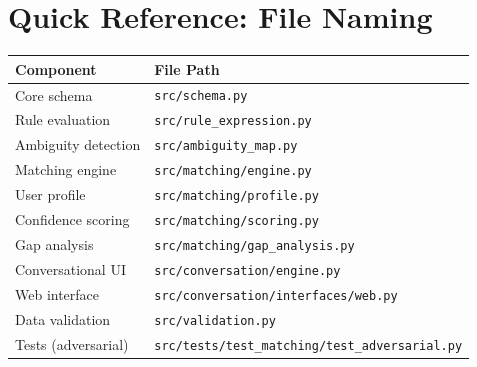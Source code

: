 \documentclass[11pt,a4paper]{report}
\begin{document}
\chapter{Quick Reference: File Naming}

\begin{table}[H]
\centering
\small
\begin{tabular}{p{3cm}p{4cm}}
\toprule
Component & File Path \\
\midrule
Core schema & \texttt{src/schema.py} \\
Rule evaluation & \texttt{src/rule\_expression.py} \\
Ambiguity detection & \texttt{src/ambiguity\_map.py} \\
Matching engine & \texttt{src/matching/engine.py} \\
User profile & \texttt{src/matching/profile.py} \\
Confidence scoring & \texttt{src/matching/scoring.py} \\
Gap analysis & \texttt{src/matching/gap\_analysis.py} \\
Conversational UI & \texttt{src/conversation/engine.py} \\
Web interface & \texttt{src/conversation/interfaces/web.py} \\
Data validation & \texttt{src/validation.py} \\
Tests (adversarial) & \texttt{src/tests/test\_matching/test\_adversarial.py} \\
\bottomrule
\end{tabular}
\end{table}
\end{document}
